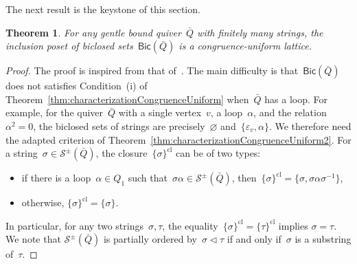 \documentclass{memo-l}
\newtheorem{theorem}{Theorem}[part]
\theoremstyle{definition}
\newcommand{\strings}{\mathcal{S}} %
\newcommand{\closure}[1]{#1^{\mathrm{cl}}} %
\newcommand{\Bicl}[1]{\mathsf{Bic}(#1)} %
\begin{document}
The next result is the keystone of this section.

\begin{theorem}
For any gentle bound quiver~$\bar Q$ with finitely many strings, the inclusion poset of biclosed sets~$\Bicl{\bar Q}$ is a congruence-uniform lattice.
\end{theorem}

\begin{proof}
The proof is inspired from that of~\cite[Thm.~6.5]{McConville}.
The main difficulty is that~$\Bicl{\bar Q}$ does not satisfies Condition~(i) of Theorem~\ref{thm:characterizationCongruenceUniform} when~$\bar Q$ has a loop.
For example, for the quiver~$\bar Q$ with a single vertex~$v$, a loop~$\alpha$, and the relation~$\alpha^2 = 0$, the biclosed sets of strings are precisely~$\varnothing$ and~$\{\varepsilon_v, \alpha\}$.
We therefore need the adapted criterion of Theorem~\ref{thm:characterizationCongruenceUniform2}.
For a string~$\sigma \in \strings^\pm(\bar Q)$, the closure~$\closure{\{\sigma\}}$ can be of two types:
\begin{itemize}
\item if there is a loop~$\alpha \in Q_1$ such that~$\sigma \alpha \in \strings^\pm(\bar Q)$, then~$\closure{\{\sigma\}} = \{\sigma, \sigma \alpha \sigma^{-1}\}$,
\item otherwise, $\closure{\{\sigma\}} = \{\sigma\}$.
\end{itemize}
In particular, for any two strings~$\sigma, \tau$, the equality~$\closure{\{\sigma\}}=\closure{\{\tau\}}$ implies $\sigma=\tau$.
We note that $\strings^\pm(\bar Q)$ is partially ordered by~$\sigma \vartriangleleft \tau$ if and only if~$\sigma$ is a substring of~$\tau$.


\end{proof}
\end{document}
